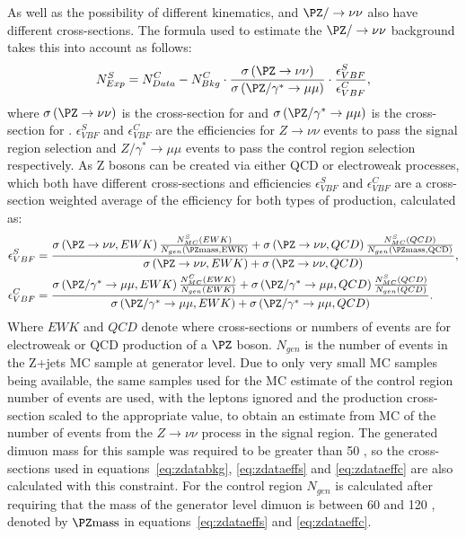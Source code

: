 As well as the possibility of different kinematics, \Zmumu and $\PZ/\rightarrow\nu\nu$ also have different cross-sections. The formula used to estimate the $\PZ/\rightarrow\nu\nu$ background takes this into account as follows:
\begin{equation}
  \label{eq:zdatabkg}
  N^{S}_{Exp}=N^{C}_{Data}-N^{C}_{Bkg}\cdot\frac{\sigma\left(\PZ\rightarrow\nu\nu\right)}{\sigma\left(\PZ/\gamma^{*}\rightarrow\mu\mu\right)}\cdot\frac{\epsilon^{S}_{VBF}}{\epsilon^{C}_{VBF}},
\end{equation}
where $\sigma\left(\PZ\rightarrow\nu\nu\right)$ is the cross-section for \Znunu and $\sigma\left(\PZ/\gamma^{*}\rightarrow\mu\mu\right)$ is the cross-section for \Zmumu. $\epsilon^{S}_{VBF}$ and $\epsilon^{C}_{VBF}$ are the efficiencies for $Z\rightarrow\nu\nu$ events to pass the signal region selection and $Z/\gamma^{*}\rightarrow\mu\mu$ events to pass the control region selection respectively. As Z bosons can be created via either \ac{QCD} or electroweak processes, which both have different cross-sections and efficiencies $\epsilon^{S}_{VBF}$ and $\epsilon^{C}_{VBF}$ are a cross-section weighted average of the efficiency for both types of production, calculated as:
\begin{align}
  \label{eq:zdataeffs}
  \epsilon^{S}_{VBF}&=\frac{ \sigma\left(\PZ\rightarrow\nu\nu,EWK\right) \frac{N^{S}_{MC}\left(EWK\right)} {N_{gen}\left(\PZ \rm{mass},EWK\right)} + \sigma\left(\PZ\rightarrow\nu\nu,QCD\right) \frac{N^{S}_{MC}\left(QCD\right)} {N_{gen}\left(\PZ \rm{mass},QCD\right)} } {\sigma\left(\PZ\rightarrow\nu\nu,EWK\right) + \sigma\left(\PZ\rightarrow\nu\nu,QCD\right)},\\
  \label{eq:zdataeffc}
  \epsilon^{C}_{VBF}&=\frac{  \sigma\left(\PZ/\gamma^{*}\rightarrow\mu\mu,EWK\right) \frac{N^{C}_{MC}\left(EWK\right)} {N_{gen}\left(EWK\right)} + \sigma\left(\PZ/\gamma^{*}\rightarrow\mu\mu,QCD\right) \frac{N^{S}_{MC}\left(QCD\right)} {N_{gen}\left(QCD\right)}  }{\sigma\left(\PZ/\gamma^{*}\rightarrow\mu\mu,EWK\right)+\sigma\left(\PZ/\gamma^{*}\rightarrow\mu\mu,QCD\right)}.
\end{align}
Where $EWK$ and $QCD$ denote where cross-sections or numbers of events are for electroweak or \ac{QCD} production of a $\PZ$ boson. $N_{gen}$ is the number of events in the Z+jets \ac{MC} sample at generator level. Due to only very small \Znunu \ac{MC} samples being available, the same \Zmumu samples used for the \ac{MC} estimate of the control region number of events are used, with the leptons ignored and the production cross-section scaled to the appropriate value, to obtain an estimate from \ac{MC} of the number of events from the $Z\rightarrow\nu\nu$ process in the signal region. The generated dimuon mass for this sample was required to be greater than 50 \GeV, so the cross-sections used in equations~\ref{eq:zdatabkg}, \ref{eq:zdataeffs} and \ref{eq:zdataeffc} are also calculated with this constraint. For the control region $N_{gen}$ is calculated after requiring that the mass of the generator level dimuon is between 60 and 120 \GeV, denoted by $\PZ \rm{mass}$ in equations~\ref{eq:zdataeffs} and \ref{eq:zdataeffc}.

